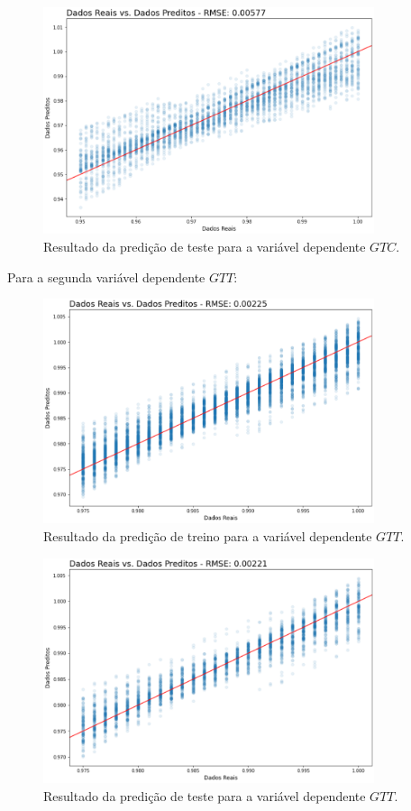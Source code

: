 \documentclass[a4paper, 12pt]{article}
\theoremstyle{definition}
\theoremstyle{remark}
\begin{document}
\begin{figure}[h]
  \centering
  \includegraphics[width=9.7cm]{testeGT}
  \caption{Resultado da predição de teste para a variável dependente $GTC$.}
  \label{fig:testeGT}
\end{figure}

Para a segunda variável dependente $GTT$:

\begin{figure}
  \centering
  \includegraphics[width=9.7cm]{treinoGT1}
  \caption{Resultado da predição de treino para a variável dependente $GTT$.}
  \label{fig:treinoGT1}
\end{figure}

\begin{figure}
  \centering
  \includegraphics[width=9.7cm]{testeGT1}
  \caption{Resultado da predição de teste para a variável dependente $GTT$.}
  \label{fig:testeGT1}
\end{figure}
\end{document}
